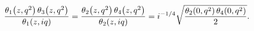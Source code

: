 \[\frac{\mathop{\theta_{1}\/}\nolimits\!\left(z,q^{2}\right)\mathop{\theta_{3}\/%
}\nolimits\!\left(z,q^{2}\right)}{\mathop{\theta_{1}\/}\nolimits\!\left(z,iq%
\right)}=\frac{\mathop{\theta_{2}\/}\nolimits\!\left(z,q^{2}\right)\mathop{%
\theta_{4}\/}\nolimits\!\left(z,q^{2}\right)}{\mathop{\theta_{2}\/}\nolimits\!%
\left(z,iq\right)}=i^{-1/4}\sqrt{\frac{\mathop{\theta_{2}\/}\nolimits\!\left(0%
,q^{2}\right)\mathop{\theta_{4}\/}\nolimits\!\left(0,q^{2}\right)}{2}}.\]